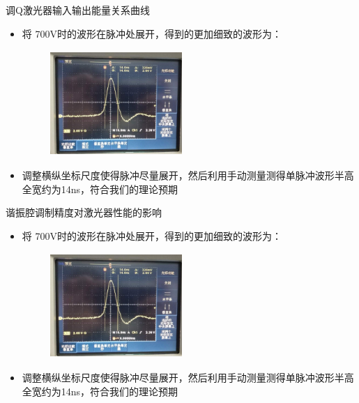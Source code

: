 \documentclass{beamer}
\begin{document}
\begin{frame}{调Q激光器输入输出能量关系曲线}
  \begin{itemize}
    \item 将 700V时的波形在脉冲处展开，得到的更加细致的波形为：
    \begin{figure}
      \includegraphics[height=4cm,width=5cm]{images/13.jpg}
      \label{fg7}
    \end{figure}
    \item 调整横纵坐标尺度使得脉冲尽量展开，然后利用手动测量测得单脉冲波形半高全宽约为14ns，符合我们的理论预期
  \end{itemize}
\end{frame}
\begin{frame}{谐振腔调制精度对激光器性能的影响}
  \begin{itemize}
    \item 将 700V时的波形在脉冲处展开，得到的更加细致的波形为：
    \begin{figure}
      \includegraphics[height=4cm,width=5cm]{images/13.jpg}
      \label{fg7}
    \end{figure}
    \item 调整横纵坐标尺度使得脉冲尽量展开，然后利用手动测量测得单脉冲波形半高全宽约为14ns，符合我们的理论预期
  \end{itemize}
\end{frame}
\end{document}
